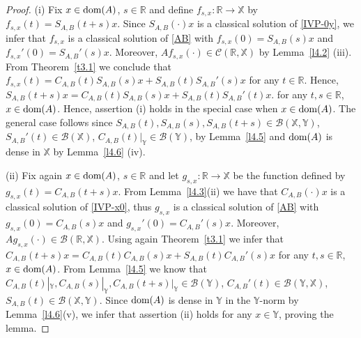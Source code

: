 \documentclass[11pt]{amsart}
\numberwithin{equation}{section}
\newcommand{\SAB}{S_{A,B}}
\newcommand{\CAB}{C_{A,B}}
\theoremstyle{remark}
\theoremstyle{definition}
\newcommand\bX{{\mathbb X}}
\newcommand\bY{{\mathbb Y}}
\newcommand{\dom}{\text{\rm{dom}}}
\begin{document}
\begin{proof}
	(i) Fix $x \in \dom(A)$, $s \in \mathbb{R}$ and define $f_{s,x} : \mathbb{R} \to\bX$ by $f_{s,x}(t) = \SAB(t+s)x$. Since $\SAB(\cdot)x$ is a classical solution of \eqref{IVP-0y}, we infer that $f_{s,x}$ is a classical solution of 
	\eqref{AB} with $f_{s,x}(0)=\SAB(s)x$ and $f_{s,x}'(0)=\SAB'(s)x$. Moreover,  $Af_{s,x}(\cdot) \in \mathcal{C}(\mathbb{R}, \bX)$ by Lemma~\ref{l4.2} (iii). From Theorem~\ref{t3.1} we conclude that
	$f_{s,x}(t) = \CAB(t)\SAB(s)x + \SAB(t)\SAB'(s)x$
	for any $t \in \mathbb{R}$. Hence, $\SAB(t+s)x = \CAB(t)\SAB(s)x + \SAB(t)\SAB'(t)x$. for any $t, s \in \mathbb{R}$, $x \in \dom(A)$. Hence, assertion (i) holds in the special case when $x\in\dom(A)$. The general case follows since $\SAB(t), \SAB(s), \SAB(t+s) \in \mathcal{B}(\bX,\bY)$, $\SAB'(t) \in \mathcal{B}(\bX)$, $\CAB(t)|_\bY \in \mathcal{B}(\bY)$, by Lemma~\ref{l4.5} and $\dom(A)$ is dense in  $\bX$ by Lemma~\ref{l4.6} (iv).
	
	(ii) Fix again $x \in \dom(A)$, $s \in \mathbb{R}$ and let $g_{s,x} : \mathbb{R} \to\bX$ be the function defined by $g_{s,x}(t) = \CAB(t+s)x$. From Lemma~\ref{l4.3}(ii) we have that $\CAB(\cdot)x$ is a classical solution of \eqref{IVP-x0}, thus $g_{s,x}$ is a classical solution of \eqref{AB} with 
	$g_{s,x}(0)=\CAB(s)x$ and $g_{s,x}'(0)=\CAB'(s)x$. Moreover, $Ag_{s,x}(\cdot) \in \mathcal{B}(\mathbb{R}, \bX)$.  Using again Theorem~\ref{t3.1} we infer that $\CAB(t+s)x = \CAB(t)\CAB(s)x + \SAB(t)\CAB'(s)x$ for any $t,s\in\mathbb{R}$, $x \in \dom(A)$.
	From Lemma~\ref{l4.5} we know that $\CAB(t)|_\bY, \CAB(s)|_\bY, \CAB(t+s)|_\bY \in \mathcal{B}(\bY)$, $\CAB'(t) \in \mathcal{B}(\bY,\bX)$, $\SAB(t) \in \mathcal{B}(\bX,\bY)$. Since $\dom(A)$ is dense in $\bY$ in the $\bY$-norm by Lemma~\ref{l4.6}(v), we infer that assertion (ii) holds for any $x \in\bY$, proving the lemma.
\end{proof}
\end{document}
